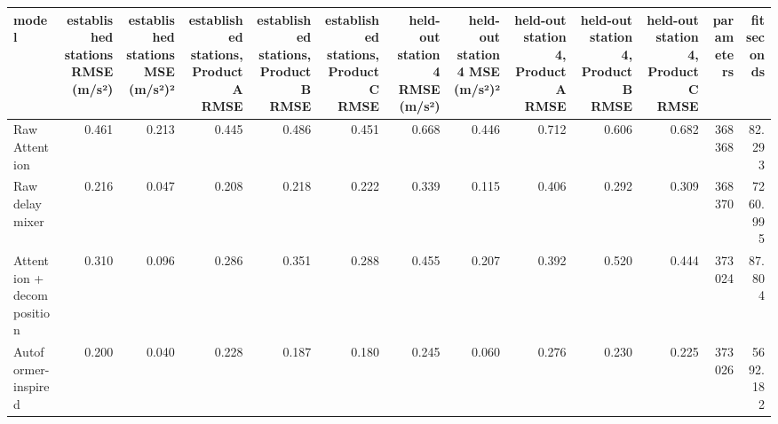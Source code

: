 \begin{tabular}{lrrrrrrrrrrrr}
\toprule
model & established stations RMSE (m/s²) & established stations MSE (m/s²)² & established stations, Product A RMSE & established stations, Product B RMSE & established stations, Product C RMSE & held-out station 4 RMSE (m/s²) & held-out station 4 MSE (m/s²)² & held-out station 4, Product A RMSE & held-out station 4, Product B RMSE & held-out station 4, Product C RMSE & parameters & fit seconds \\
\midrule
Raw Attention & 0.461 & 0.213 & 0.445 & 0.486 & 0.451 & 0.668 & 0.446 & 0.712 & 0.606 & 0.682 & 368368 & 82.293 \\
Raw delay mixer & 0.216 & 0.047 & 0.208 & 0.218 & 0.222 & 0.339 & 0.115 & 0.406 & 0.292 & 0.309 & 368370 & 7260.995 \\
Attention + decomposition & 0.310 & 0.096 & 0.286 & 0.351 & 0.288 & 0.455 & 0.207 & 0.392 & 0.520 & 0.444 & 373024 & 87.804 \\
Autoformer-inspired & 0.200 & 0.040 & 0.228 & 0.187 & 0.180 & 0.245 & 0.060 & 0.276 & 0.230 & 0.225 & 373026 & 5692.182 \\
\bottomrule
\end{tabular}
